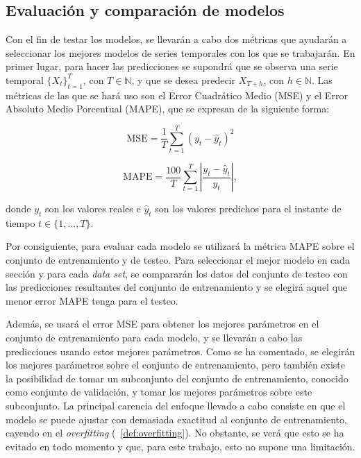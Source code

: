 \documentclass[12pt,twoside]{article}
\begin{document}
\subsection{Evaluación y comparación de modelos}

Con el fin de testar los modelos, se llevarán a cabo dos métricas que ayudarán a seleccionar los mejores modelos de series temporales con los que se trabajarán. En primer lugar, para hacer las predicciones se supondrá que se observa una serie temporal $\{X_t\}_{t=1}^{T}$, con $T \in \mathbb{N}$, y que se desea predecir $X_{T+h}$, con $h \in \mathbb{N}$. Las métricas de las que se hará uso son el Error Cuadrático Medio (MSE) y el Error Absoluto Medio Porcentual (MAPE), que se expresan de la siguiente forma: 

\begin{equation}
\mathrm{MSE} = \frac{1}{T} \sum_{t=1}^{T} (y_t - \hat{y}_t)^2
\end{equation}

\begin{equation}
\mathrm{MAPE} = \frac{100}{T} \sum_{t=1}^{T} \left| \frac{y_t - \hat{y}_t}{y_t} \right|,
\end{equation}

donde $y_t$ son los valores reales e $\hat{y}_t$ son los valores predichos para el instante de tiempo $t \in \{1,...,T\}$.

Por consiguiente, para evaluar cada modelo se utilizará la métrica MAPE sobre el conjunto de entrenamiento y de testeo. Para seleccionar el mejor modelo en cada sección y para cada \textit{data set}, se compararán los datos del conjunto de testeo con las predicciones resultantes del conjunto de entrenamiento y se elegirá aquel que menor error MAPE tenga para el testeo.

Además, se usará el error MSE para obtener los mejores parámetros en el conjunto de entrenamiento para cada modelo, y se llevarán a cabo las predicciones usando estos mejores parámetros. Como se ha comentado, se elegirán los mejores parámetros sobre el conjunto de entrenamiento, pero también existe la posibilidad de tomar un subconjunto del conjunto de entrenamiento, conocido como conjunto de validación, y tomar los mejores parámetros sobre este subconjunto. La principal carencia del enfoque llevado a cabo consiste en que el modelo se puede ajustar con demasiada exactitud al conjunto de entrenamiento, cayendo en el \textit{overfitting} (~\ref{def:overfitting}). No obstante, se verá que esto se ha evitado en todo momento y que, para este trabajo, esto no supone una limitación.
\end{document}
